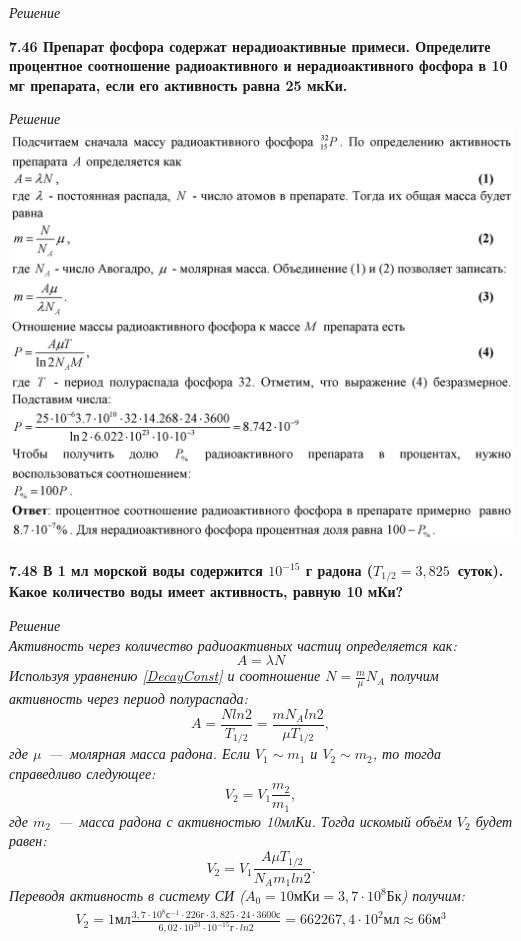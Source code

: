\documentclass[a4paper, fontsize=14pt]{extreport}
\begin{document}
{\textit{Решение \\
%
}

\textbf{7.46 Препарат фосфора  содержат нерадиоактивные примеси. Определите процентное соотношение радиоактивного и нерадиоактивного фосфора в 10 мг препарата, если его активность равна 25 мкКи.}

\textit{Решение \\
%
}
\includegraphics[width=\textwidth]{746}

\textbf{7.48 В 1 мл морской воды содержится $10^{-15}$ г радона  ($T_{1/2} = 3,825 $~суток). Какое количество воды имеет активность, равную 10 мКи?}

\textit{Решение \\
Активность через количество радиоактивных частиц определяется как:
\begin{equation}
  A = \lambda N
\end{equation} 
Используя уравнению \ref{DecayConst} и соотношение $N = \frac{m}{\mu}N_A$ получим активность через период полураспада:
\begin{equation}
  A = \frac{N ln2}{T_{1/2}} = \frac{mN_A ln2}{\mu  T_{1/2}}, 
\end{equation} 
где $\mu$~---~молярная масса радона. 
Если $V_1 \sim m_1$ и $V_2 \sim m_2$, то тогда справедливо следующее:
\begin{equation}
  V_2 = V_1\frac{m_2}{m_1},
\end{equation} 
где $m_2$~---~масса радона с активностью 10млКи. Тогда искомый объём $V_2$ будет равен:
\begin{equation}
  V_2 = V_1\frac{A \mu  T_{1/2}}{N_A m_1 ln2 }.
\end{equation}
Переводя активность в систему СИ ($A_0 = 10 \text{мКи} =3,7 \cdot 10^8\text{Бк}$) получим:
\begin{eqnarray}
  V_2 = 1\text{мл}\frac{3,7\cdot 10^8 \text{с}^{-1} \cdot 226 \text{г} \cdot 3,825 \cdot 24 \cdot 3600 \text{с}}{6,02 \cdot 10^{23} \cdot 10^{-15}\text{г} \cdot ln2}  = 662267,4\cdot 10^{2}\text{мл} \approx 66 \text{м}^3
\end{eqnarray}
}


}
\end{document}
